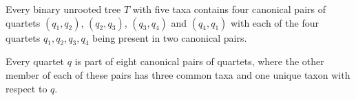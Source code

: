 \documentclass[runningheads]{llncs}
\newcommand{\add}[1]{{\color{blue} #1}}
\begin{document}

\vspace{-7pt}
\begin{corollary}
\label{cor:two-pair-quartets}
 
Every binary unrooted tree $T$ with five taxa contains four canonical pairs of quartets $(q_1,q_2)$, $(q_2,q_3)$, $(q_3,q_4)$ and $(q_4,q_1)$ with each of the four quartets $q_1, q_2, q_3, q_4$ being present in two canonical pairs. 
\end{corollary}

\vspace{-15pt}
\begin{corollary}
\label{cor:eight-pairs}
\add{Every quartet $q$ is part of eight canonical pairs of quartets, where the other member of each of these pairs has three common taxa and one unique taxon with respect to $q$.} 
\end{corollary}



\end{document}
